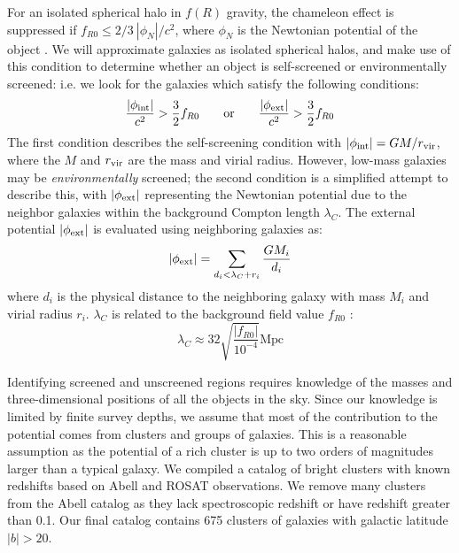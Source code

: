 \documentclass[useAMS,usenatbib,twocolumn]{mn2e}
\begin{document}
For an isolated spherical halo in $f(R)$ gravity,
the chameleon effect is suppressed if $f_{R0} \leq 2/3\
|\phi_N|/c^2$, where $\phi_N$ is the Newtonian  potential of the object
\citep{hu07}. We will approximate galaxies as isolated spherical halos,
and make use of this condition to determine whether an
object is self-screened or environmentally screened: i.e. we look for the
galaxies which satisfy the following conditions: 
\begin{equation}
\label{eq:criterion} 
 \frac{|\phi_{\rm int}|}{c^2}>\frac{3}{2} f_{R0}\; \; \; \; \; \; \; \mathrm{or}
\; \; \; \; \; \; \; \frac{|\phi_{\rm ext}|}{c^2}>\frac{3}{2} f_{R0}
\end{equation}
The first condition describes the self-screening condition with 
$ |\phi_{\rm int}|= GM/r_{\rm vir}$, where the $M$ and $r_{\rm vir}$ are the
mass and virial radius. However, low-mass
galaxies may be \textit{environmentally} screened; the second condition is a
simplified attempt to describe this,  with $|\phi_{\rm ext}|$ representing the
Newtonian potential due to the neighbor galaxies within the background Compton
length $\lambda_C$.
The external potential $|\phi_{\rm ext}|$ is evaluated using 
neighboring galaxies as:
\begin{equation}\label{eq:criterion22} 
 |\phi_{\rm ext}|= \sum_{d_i<\lambda_C+r_i} \frac{GM_i}{d_i}
\end{equation}
where $d_i$ is the physical distance to the neighboring
galaxy with mass $M_i$ and virial radius $r_i$. $\lambda_C$ is related
to the background field value $f_{R0}$
\citep{sch09}:
\begin{equation}
 \lambda_C \approx 32 \sqrt{\frac{\left|f_{R0}\right|}{10^{-4}}} \mathrm{ Mpc}
 \label{eq:compton}
\end{equation}

Identifying screened and unscreened regions requires knowledge of the masses and
three-dimensional positions of all the objects in the sky.
Since our knowledge is limited by finite survey depths,
we assume that most of the contribution to the potential comes from
clusters and groups of galaxies. This is a reasonable assumption as the
potential of a rich cluster is up to 
two orders of magnitudes larger than a typical galaxy. We
compiled a catalog of bright clusters with known redshifts based on 
Abell \citep{abe89} and ROSAT \citep{ebe96} observations. We remove many
clusters from the Abell catalog as they lack spectroscopic
redshift or have redshift greater than 0.1. Our final catalog contains 675
clusters of galaxies with galactic latitude $\left|b\right| > 20$.
\end{document}
